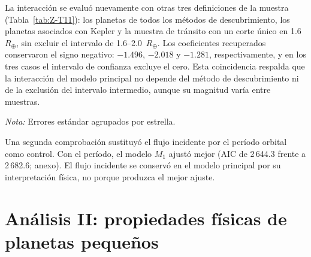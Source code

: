 La interacción se evaluó nuevamente con otras tres definiciones de la muestra (Tabla~\ref{tab:Z-T11}): los planetas de todos los métodos de descubrimiento, los planetas asociados con Kepler y la muestra de tránsito con un corte único en 1.6~$R_\oplus$, sin excluir el intervalo de 1.6--2.0~$R_\oplus$. Los coeficientes recuperados conservaron el signo negativo: $-1.496$, $-2.018$ y $-1.281$, respectivamente, y en los tres casos el intervalo de confianza excluye el cero. Esta coincidencia respalda que la interacción del modelo principal no depende del método de descubrimiento ni de la exclusión del intervalo intermedio, aunque su magnitud varía entre muestras.

\begin{table}[htbp]
    \centering
    \caption{Robustez de la interacción entre flujo incidente y masa estelar: coeficiente en M2 y mejora de M2 respecto a M1 en distintas muestras y definiciones.}
    \label{tab:Z-T11}
    \small
    \par\smallskip
    {\footnotesize\textit{Nota:} Errores estándar agrupados por estrella.}
\end{table}

Una segunda comprobación sustituyó el flujo incidente por el período orbital como control. Con el período, el modelo $M_1$ ajustó mejor (AIC de 2\,644.3 frente a 2\,682.6; anexo). El flujo incidente se conservó en el modelo principal por su interpretación física, no porque produzca el mejor ajuste.

\section{Análisis II: propiedades físicas de planetas pequeños}
\label{sec:res-analisis-II}

